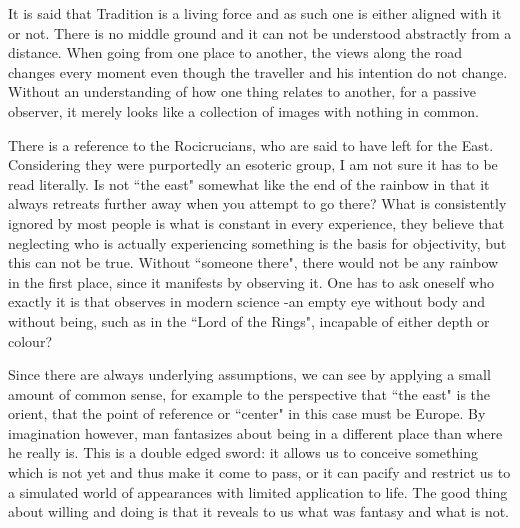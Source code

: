 \begin{footnotesize}
\begin{sffamily}
It is said that Tradition is a living force and as such one is either aligned with it or not. There is no middle ground and it can not be understood abstractly from a distance. When going from one place to another, the views along the road changes every moment even though the traveller and his intention do not change. Without an understanding of how one thing relates to another, for a passive observer, it merely looks like a collection of images with nothing in common.

There is a reference to the Rocicrucians, who are said to have left for the East. Considering they were purportedly an esoteric group, I am not sure it has to be read literally. Is not ``the east" somewhat like the end of the rainbow in that it always retreats further away when you attempt to go there? What is consistently ignored by most people is what is constant in every experience, they believe that neglecting who is actually experiencing something is the basis for objectivity, but this can not be true. Without ``someone there", there would not be any rainbow in the first place, since it manifests by observing it. One has to ask oneself who exactly it is that observes in modern science -an empty eye without body and without being, such as in the ``Lord of the Rings", incapable of either depth or colour?

Since there are always underlying assumptions, we can see by applying a small amount of common sense, for example to the perspective that ``the east" is the orient, that the point of reference or ``center" in this case must be Europe. By imagination however, man fantasizes about being in a different place than where he really is. This is a double edged sword: it allows us to conceive something which is not yet and thus make it come to pass, or it can pacify and restrict us to a simulated world of appearances with limited application to life. The good thing about willing and doing is that it reveals to us what was fantasy and what is not.


\end{sffamily}\end{footnotesize}
